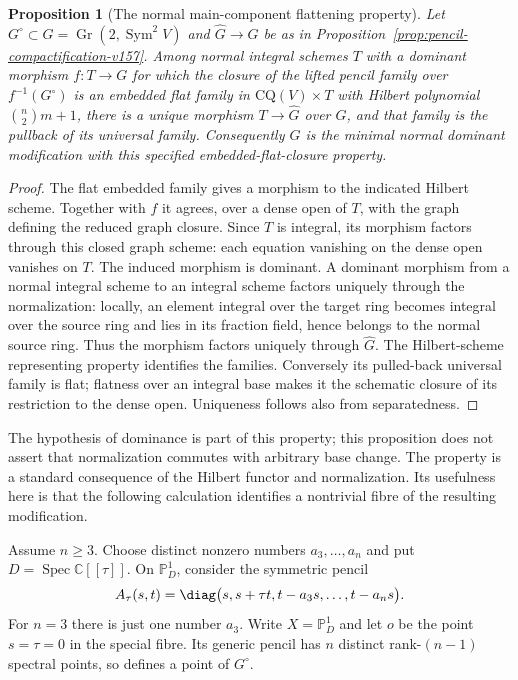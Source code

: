 \documentclass[11pt,reqno]{amsart}
\numberwithin{equation}{section}
\newtheorem{proposition}[theorem]{Proposition}
\theoremstyle{definition}\newtheorem{definition}[theorem]{Definition}
\theoremstyle{remark}\newtheorem{remark}[theorem]{Remark}
\newcommand{\C}{\mathbb C}\newcommand{\Q}{\mathbb Q}
\newcommand{\Pj}{\mathbb P}\newcommand{\A}{\mathbb A}
\DeclareMathOperator{\Sym}{Sym}\DeclareMathOperator{\Gr}{Gr}
\DeclareMathOperator{\Spec}{Spec}\DeclareMathOperator{\PGL}{PGL}
\begin{document}
\begin{proposition}[The normal main-component flattening property]
\label{prop:flattening-property-v158}
Let $G^\circ\subset G=\Gr(2,\Sym^2V)$ and
$\widehat G\to G$ be as in Proposition~\ref{prop:pencil-compactification-v157}.
Among normal integral schemes $T$ with a dominant morphism $f:T\to G$
for which the closure of the lifted pencil family over $f^{-1}(G^\circ)$
is an embedded flat family in $\mathrm{CQ}(V)\times T$ with Hilbert
polynomial $\binom n2 m+1$, there is a unique morphism $T\to\widehat G$
over $G$, and that family is the pullback of its universal family.
Consequently $\widehat G$ is the minimal normal dominant modification
with this specified embedded-flat-closure property.
\end{proposition}
\begin{proof}
The flat embedded family gives a morphism to the indicated Hilbert
scheme. Together with $f$ it agrees, over a dense open of $T$, with
the graph defining the reduced graph closure. Since $T$ is integral,
its morphism factors through this closed graph scheme: each equation
vanishing on the dense open vanishes on $T$. The induced morphism is
dominant. A dominant morphism from a normal integral scheme to an
integral scheme factors uniquely through the normalization: locally,
an element integral over the target ring becomes integral over the
source ring and lies in its fraction field, hence belongs to the
normal source ring. Thus the morphism factors uniquely through
$\widehat G$. The Hilbert-scheme representing property identifies
the families. Conversely its pulled-back universal family is flat;
flatness over an integral base makes it the schematic closure of its
restriction to the dense open. Uniqueness follows also from separatedness.
\end{proof}

The hypothesis of dominance is part of this property; this proposition
does not assert that normalization commutes with arbitrary base change.
The property is a standard consequence of the Hilbert functor and
normalization. Its usefulness here is that the following calculation
identifies a nontrivial fibre of the resulting modification.

Assume $n\geq3$. Choose distinct nonzero numbers $a_3,\ldots,a_n$ and put
$D=\Spec\C[[\tau]]$. On $\Pj^1_D$, consider the symmetric pencil
\begin{equation}\label{eq:collision-family-v158}
 A_\tau(s,t)=\diag\bigl(s,s+\tau t,
                           t-a_3s,\ldots,t-a_ns\bigr).
\end{equation}
For $n=3$ there is just one number $a_3$. Write $X=\Pj^1_D$ and let
$o$ be the point $s=\tau=0$ in the special fibre. Its generic pencil
has $n$ distinct rank-$(n-1)$ spectral points, so defines a point of
$G^\circ$.
\end{document}
